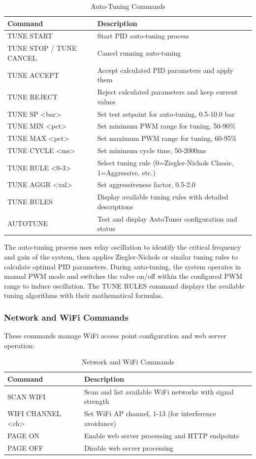 \begin{table}[H]
\centering
\begin{tabular}{@{}ll@{}}
\toprule
\textbf{Command} & \textbf{Description} \\
\midrule
TUNE START & Start PID auto-tuning process \\
TUNE STOP / TUNE CANCEL & Cancel running auto-tuning \\
TUNE ACCEPT & Accept calculated PID parameters and apply them \\
TUNE REJECT & Reject calculated parameters and keep current values \\
TUNE SP <bar> & Set test setpoint for auto-tuning, 0.5-10.0 bar \\
TUNE MIN <pct> & Set minimum PWM range for tuning, 50-90\% \\
TUNE MAX <pct> & Set maximum PWM range for tuning, 60-95\% \\
TUNE CYCLE <ms> & Set minimum cycle time, 50-2000ms \\
TUNE RULE <0-3> & Select tuning rule (0=Ziegler-Nichols Classic, 1=Aggressive, etc.) \\
TUNE AGGR <val> & Set aggressiveness factor, 0.5-2.0 \\
TUNE RULES & Display available tuning rules with detailed descriptions \\
AUTOTUNE & Test and display AutoTuner configuration and status \\
\bottomrule
\end{tabular}
\caption{Auto-Tuning Commands}
\end{table}

The auto-tuning process uses relay oscillation to identify the critical frequency and gain of the system, then applies Ziegler-Nichols or similar tuning rules to calculate optimal PID parameters. During auto-tuning, the system operates in manual PWM mode and switches the valve on/off within the configured PWM range to induce oscillation. The TUNE RULES command displays the available tuning algorithms with their mathematical formulas.

\subsubsection{Network and WiFi Commands}
These commands manage WiFi access point configuration and web server operation:

\begin{table}[H]
\centering
\begin{tabular}{@{}ll@{}}
\toprule
\textbf{Command} & \textbf{Description} \\
\midrule
SCAN WIFI & Scan and list available WiFi networks with signal strength \\
WIFI CHANNEL <ch> & Set WiFi AP channel, 1-13 (for interference avoidance) \\
PAGE ON & Enable web server processing and HTTP endpoints \\
PAGE OFF & Disable web server processing \\
\bottomrule
\end{tabular}
\caption{Network and WiFi Commands}
\end{table}

